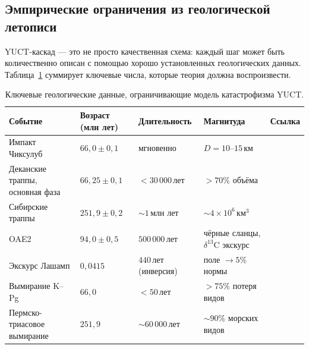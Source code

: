 \documentclass[11pt,a4paper]{article}
\begin{document}
	\subsection{Эмпирические ограничения из геологической летописи}
	
	YUCT-каскад — это не просто качественная схема: каждый шаг может быть
	количественно описан с помощью хорошо установленных геологических данных. Таблица~\ref{tab:geodata}
	суммирует ключевые числа, которые теория должна воспроизвести.
	
	\begin{table}[H]
		\centering
		\small
		\caption{Ключевые геологические данные, ограничивающие модель катастрофизма YUCT.}
		\label{tab:geodata}
		\begin{tabular}{@{}p{4.2cm} p{2.6cm} p{2.8cm} p{4.2cm} p{1.2cm}@{}}
			\toprule
			\textbf{Событие} & \textbf{Возраст (млн лет)} & \textbf{Длительность} & \textbf{Магнитуда} & \textbf{Ссылка} \\
			\midrule
			Импакт Чиксулуб & \(66,0 \pm 0,1\) & мгновенно & \(D = 10\)–\(15\) км & \cite{Schulte2010} \\
			Деканские траппы, основная фаза & \(66,25 \pm 0,1\) & \(<30\,000\) лет & \(>70\%\) объёма & \cite{Schoene2019} \\
			Сибирские траппы & \(251,9 \pm 0,2\) & \(\sim 1\) млн лет & \(\sim 4\times10^6\) км\(^3\) & \cite{SiberianTraps} \\
			OAE2 & \(94,0 \pm 0,5\) & \(500\,000\) лет & чёрные сланцы, \(\delta^{13}\)C экскурс & \cite{Jenkyns2010} \\
			Экскурс Лашамп & \(0,0415\) & \(440\) лет (инверсия) & поле \(\to 5\%\) нормы & \cite{Laschamp} \\
			Вымирание K–Pg & \(66,0\) & \(<50\) лет & \(>75\%\) потеря видов & \cite{Schulte2010} \\
			Пермско-триасовое вымирание & \(251,9\) & \(\sim 60\,000\) лет & \(\sim 90\%\) морских видов & \cite{Burgess2014} \\
			\bottomrule
		\end{tabular}
	\end{table}
	
\end{document}
